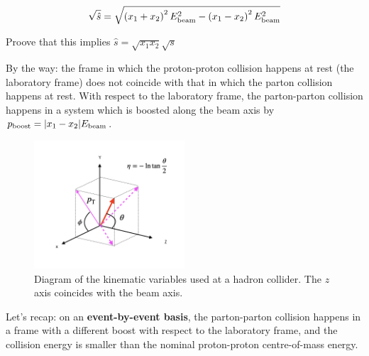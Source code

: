\begin{align*}
\sqrt{\hat{s}} = \sqrt{\left( x_1 + x_2 \right) ^2 E_{\mathrm{beam}}^2 - \left( x_1 - x_2\right)^2 E_{\mathrm{beam}}^2}
\end{align*}

\begin{mybox}
\begin{ExerciseList}
\Exercise Proove that this implies $\hat{s} = \sqrt{x_1 x_2} \sqrt{s}$
\end{ExerciseList}
\end{mybox}

By the way: the frame in which the proton-proton collision happens at rest (the laboratory frame) does not coincide with that in which the parton collision happens at rest. With respect to the laboratory frame, the parton-parton collision happens in a system which is boosted along the beam axis by $p_{\mathrm{boost}} = |x_1-x_2| E_{\mathrm{beam}}$.

 \begin{figure}[!h]
\begin{center}
\includegraphics[width=0.5\textwidth]{./Figures/collider_physics_variables.png}
\end{center}
\caption{Diagram of the kinematic variables used at a hadron collider. The $z$ axis coincides with the beam axis.}
\label{fig:collider_variables}
\end{figure}


Let's recap: on an \textbf{event-by-event basis}, the parton-parton collision happens in a frame with a different boost with respect to the laboratory frame, and the collision energy is smaller than the nominal proton-proton centre-of-mass energy. 

